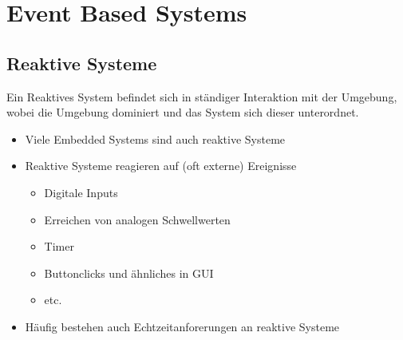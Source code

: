 \section{Event Based Systems}
\subsection{Reaktive Systeme}
Ein Reaktives System befindet sich in ständiger Interaktion mit der Umgebung, wobei die Umgebung dominiert und das System sich dieser unterordnet.
\begin{itemize}
	\item Viele Embedded Systems sind auch reaktive Systeme
	\item Reaktive Systeme reagieren auf (oft externe) Ereignisse
	\begin{itemize}
	\item Digitale Inputs
	\item Erreichen von analogen Schwellwerten
	\item Timer
	\item Buttonclicks und ähnliches in GUI
	\item etc.
	\end{itemize}
	\item Häufig bestehen auch Echtzeitanforerungen an reaktive Systeme
\end{itemize}

